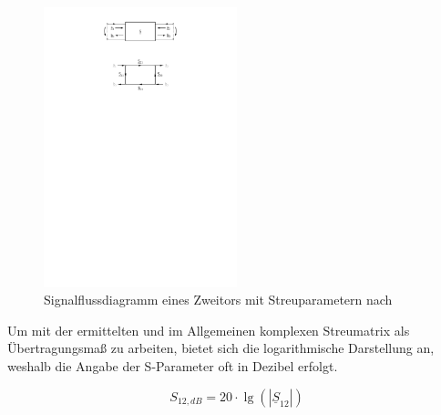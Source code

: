 \begin{figure}
    \centering
    \includegraphics[page = 1, trim = 5.9cm 19.2cm 5.9cm 5cm, clip, width = 0.5\textwidth]{Abbildungen/Kapitel4/Zweitor.pdf}
    \caption{Signalflussdiagramm eines Zweitors mit Streuparametern nach~\cite{Grundkurs_Hochfrequenztechnik}}
    \label{fig:4_Signalflussdiagramm_Zweitor}
\end{figure}

Um mit der ermittelten und im Allgemeinen komplexen Streumatrix als Übertragungsmaß zu arbeiten, bietet sich die logarithmische Darstellung an, weshalb die Angabe der S-Parameter oft in Dezibel erfolgt.

\begin{equation}
    S_{12, dB} = 20 \cdot \lg \left( \left| \underline{S}_{12} \right| \right)
\end{equation}









